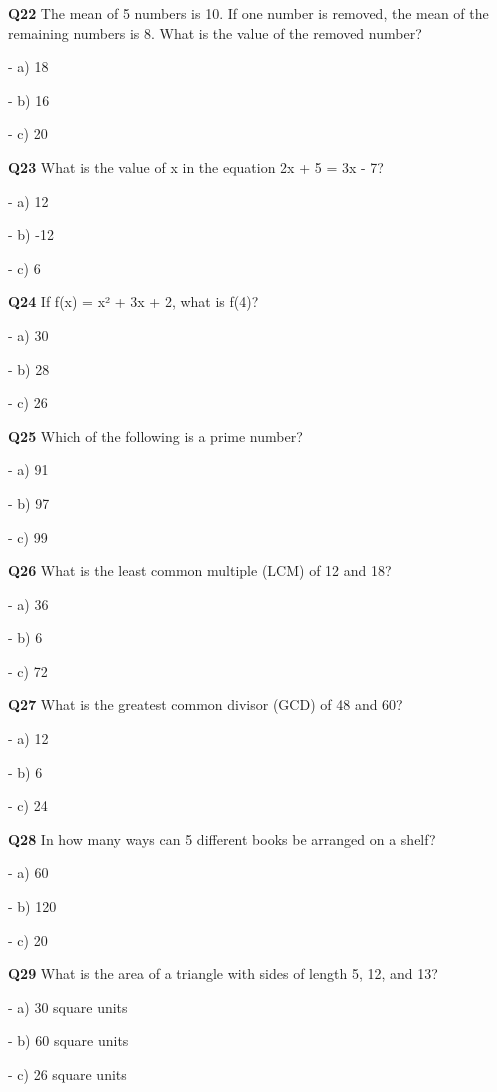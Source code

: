 \textbf{Q22} The mean of 5 numbers is 10. If one number is removed, the mean of the remaining numbers is 8. What is the value of the removed number?\par
\quad - a) 18\par
\quad - b) 16\par
\quad - c) 20\par

\textbf{Q23} What is the value of x in the equation 2x + 5 = 3x - 7?\par
\quad - a) 12\par
\quad - b) -12\par
\quad - c) 6\par

\textbf{Q24} If f(x) = x² + 3x + 2, what is f(4)?\par
\quad - a) 30\par
\quad - b) 28\par
\quad - c) 26\par

\textbf{Q25} Which of the following is a prime number?\par
\quad - a) 91\par
\quad - b) 97\par
\quad - c) 99\par

\textbf{Q26} What is the least common multiple (LCM) of 12 and 18?\par
\quad - a) 36\par
\quad - b) 6\par
\quad - c) 72\par

\textbf{Q27} What is the greatest common divisor (GCD) of 48 and 60?\par
\quad - a) 12\par
\quad - b) 6\par
\quad - c) 24\par

\textbf{Q28} In how many ways can 5 different books be arranged on a shelf?\par
\quad - a) 60\par
\quad - b) 120\par
\quad - c) 20\par

\textbf{Q29} What is the area of a triangle with sides of length 5, 12, and 13?\par
\quad - a) 30 square units\par
\quad - b) 60 square units\par
\quad - c) 26 square units\par

